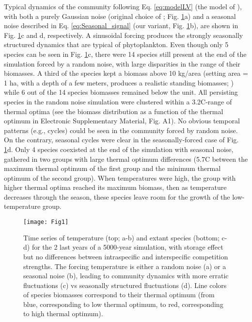 \documentclass[a4paper,12pt]{article}
\begin{document}
Typical dynamics of the community following Eq. \ref{eq:modelLV}
(the model of \citealp{scranton_coexistence_2016}), with both a purely
Gaussian noise (original choice of \citealp{scranton_coexistence_2016};
Fig. \ref{fig:Times-series_temperature_species}a) and a seasonal
noise described in Eq. \ref{eq:Seasonal_signal} (our variant, Fig.
\ref{fig:Times-series_temperature_species}b), are shown in Fig. \ref{fig:Times-series_temperature_species}c
and d, respectively. A sinusoidal forcing produces the strongly seasonally
structured dynamics that are typical of phytoplankton. Even though
only 5 species can be seen in Fig. \ref{fig:Times-series_temperature_species}c,
there were 14 species still present at the end of the simulation forced
by a random noise, with large disparities in the range of their biomasses.
A third of the species kept a biomass above 10 kg/area (setting area
= 1 ha, with a depth of a few meters, produces a realistic standing
biomasses; \citealp{reynolds2006ecology}) while 6 out of the 14 species
biomasses remained below the unit. All persisting species in the random
noise simulation were clustered within a 3.2\textdegree C-range of thermal optima
(see the biomass distribution as a function of the thermal optimum
in Electronic Supplementary Material, Fig. A1). No obvious temporal
patterns (e.g., cycles) could be seen in the community forced by random
noise. On the contrary, seasonal cycles were clear in the seasonally-forced
case of Fig. \ref{fig:Times-series_temperature_species}d. Only 4
species coexisted at the end of the simulation with seasonal noise,
gathered in two groups with large thermal optimum differences (5.7\textdegree C
between the maximum thermal optimum of the first group and the minimum
thermal optimum of the second group). When temperatures were high,
the group with higher thermal optima reached its maximum biomass,
then as temperature decreases through the season, these species leave
room for the growth of the low-temperature group.

\begin{figure}[!ht]
\begin{centering}
\texttt{[image: Fig1]}
\par\end{centering}
\caption{Time series of temperature (top; a-b) and extant species (bottom;
c-d) for the 2 last years of a 5000-year simulation, with storage
effect but no differences between intraspecific and interspecific
competition strengths. The forcing temperature is either a random
noise (a) or a seasonal noise (b), leading to community dynamics with
more erratic fluctuations (c) vs seasonally structured fluctuations
(d). Line colors of species biomasses correspond to their thermal
optimum (from blue, corresponding to low thermal optimum, to red,
corresponding to high thermal optimum).\label{fig:Times-series_temperature_species}}
\end{figure}
\end{document}
